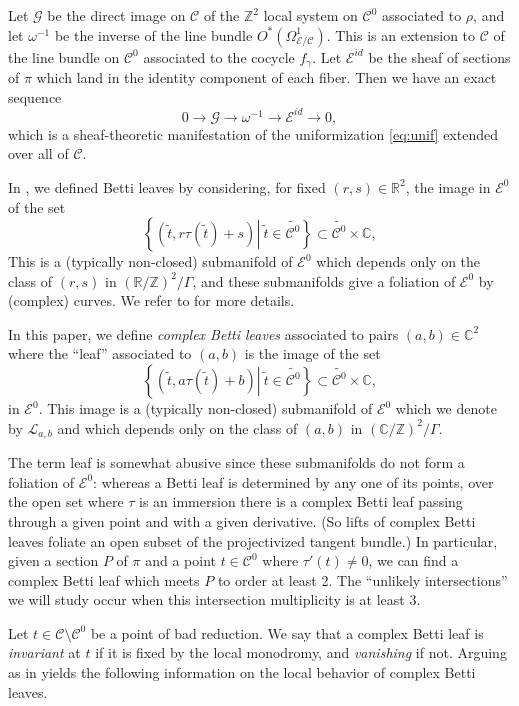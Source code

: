 \documentclass[12pt,reqno]{amsart}
\numberwithin{equation}{section}
\theoremstyle{plain}
\theoremstyle{definition}
\theoremstyle{remark}
\newcommand{\CC}{\mathcal{C}}
\newcommand{\GG}{{\mathcal{G}}}
\newcommand{\EE}{\mathcal{E}}
\newcommand{\LL}{\mathcal{L}}
\newcommand{\Z}{\mathbb{Z}}
\newcommand{\R}{\mathbb{R}}
\newcommand{\C}{\mathbb{C}}
\newcommand{\<}{\langle}
\renewcommand{\>}{\rangle}
\numberwithin{equation}{section}
\begin{document}
Let $\GG$ be the direct image on $\CC$ of the $\Z^2$ local system on
$\CC^0$ associated to $\rho$, and let $\omega^{-1}$ be the inverse of
the line bundle $O^*(\Omega^1_{\EE/\CC})$.  This is an extension to
$\CC$ of the line bundle on $\CC^0$ associated to the cocycle
$f_\gamma$.  Let $\EE^{id}$ be the sheaf of sections of $\pi$ which
land in the identity component of each fiber.  Then we have an exact
sequence
\begin{equation}\label{eq:id-comp}
0\to\GG\to\omega^{-1}\to\EE^{id}\to0,  
\end{equation}
which is a sheaf-theoretic manifestation of the uniformization
\eqref{eq:unif} extended over all of $\CC$.

In \cite{UlmerUrzua21}, we defined Betti leaves by considering, for
fixed $(r,s)\in\R^2$, the image in $\EE^0$ of the set
\[\left\{(\tilde t,r\tau(\tilde t)+s)\left|\ \tilde
      t\in\widetilde{\CC^0}\right.\right\}
\subset \widetilde{\CC^0}\times\C,\]
This is a (typically non-closed) submanifold of $\EE^0$ which depends
only on the class of $(r,s)$ in $(\R/\Z)^2/\Gamma$, and these
submanifolds give a foliation of $\EE^0$ by (complex) curves.  We
refer to \cite[\S3]{UlmerUrzua21} for more details.

In this paper, we define \emph{complex Betti leaves} associated to
pairs $(a,b)\in\C^2$ where the ``leaf'' associated to $(a,b)$ is
the image of the set 
\[\left\{(\tilde t,a\tau(\tilde t)+b)\left|\ \tilde
      t\in\widetilde{\CC^0}\right.\right\} \subset
  \widetilde{\CC^0}\times\C,\]
in $\EE^0$.  This image is a (typically non-closed) submanifold of
$\EE^0$ which we denote by $\LL_{a,b}$ and which depends only on the
class of $(a,b)$ in $(\C/\Z)^2/\Gamma$.

The term leaf is somewhat abusive since these submanifolds do not form
a foliation of $\EE^0$: whereas a Betti leaf is determined by any one
of its points, over the open set where $\tau$ is an immersion there is
a complex Betti leaf passing through a given point and with a given
derivative.  (So lifts of complex Betti leaves foliate an open subset
of the projectivized tangent bundle.)  In particular, given a section
$P$ of $\pi$ and a point $t\in\CC^0$ where $\tau'(t)\neq0$, we can
find a complex Betti leaf which meets $P$ to order at least 2.  The
``unlikely intersections'' we will study occur when this intersection
multiplicity is at least 3.

Let $t\in\CC\setminus\CC^0$ be a point of bad reduction. We say that a
complex Betti leaf is \emph{invariant} at $t$ if it is fixed by the
local monodromy, and \emph{vanishing} if not.
Arguing as in \cite[\S3.4]{UlmerUrzua21} yields the following
information on the local behavior of complex Betti leaves.
\end{document}
